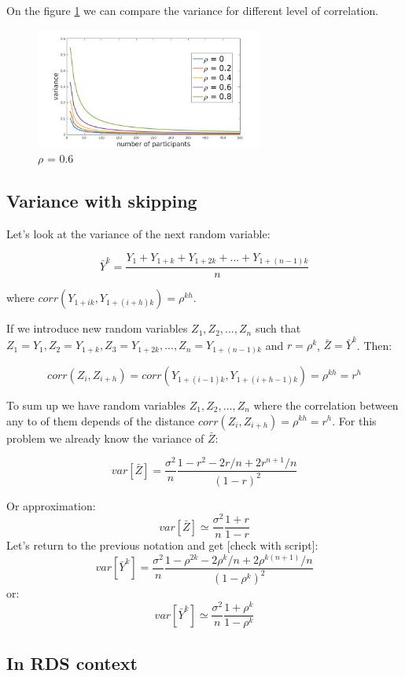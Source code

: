 \documentclass[12pt]{report}
\begin{document}
On the figure \ref{fig:diffCorr} we can compare the variance for different level of correlation.


\begin{figure}[ht]
    \centering
    \includegraphics[height=150px]{varianceIndDep2}
    \caption{ $\rho$ = 0.6 }
    \label{fig:diffCorr}
\end{figure}


\subsection{Variance with skipping}

Let's look at the variance of the next random variable:

$$\bar{Y}^k = \frac{Y_1 + Y_{1+k} + Y_{1+2k} + ... + Y_{1 + (n-1)k}}{n}$$

where $corr(Y_{1 + ik}, Y_{1 + (i+h)k}) = \rho^{kh}$. 

If we introduce new random variables $Z_1, Z_2, ..., Z_n$ such that $Z_1 = Y_1, Z_2 = Y_{1+k}, Z_3 = Y_{1+2k},..., Z_n = Y_{1 + (n-1)k}$ and $r = \rho^k$, $\bar{Z}= \bar{Y}^k$. Then:

$$corr(Z_i, Z_{i+h}) = corr(Y_{1 + (i-1)k}, Y_{1 + (i+h-1)k}) = \rho^{kh} = r^h$$

To sum up we have random variables $Z_1, Z_2, ..., Z_n$ where the correlation between any to of them depends of the distance $corr(Z_i, Z_{i+h}) = \rho^{kh} = r^h$. For this problem we already know the variance of $\bar{Z}$:


$$ var\left[\bar{Z} \right] = \frac{\sigma^2}{n}\frac{1-r^2 - 2r/n + 2r^{n+1}/n}{(1-r)^2}$$

Or approximation:
$$var\left[\bar{Z} \right] \simeq  \frac{\sigma^2}{n} \frac{1+r}{1-r}$$
Let's return to the previous notation and get [check with script]:
$$var\left[\bar{Y}^k \right] = \frac{\sigma^2}{n}\frac{1-\rho^{2k} - 2\rho^k/n + 2\rho^{k(n+1)}/n}{(1-\rho^k)^2}$$
or:
$$var\left[\bar{Y}^k \right] \simeq  \frac{\sigma^2}{n} \frac{1+\rho^k}{1-\rho^k}$$


\subsection{In RDS context}
\end{document}
